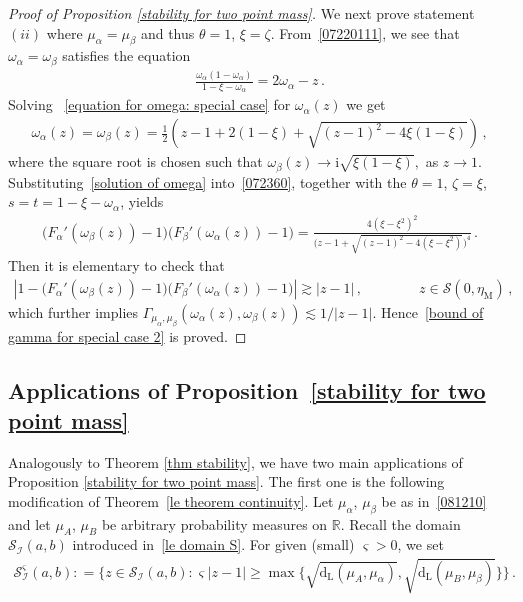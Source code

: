 \documentclass[10pt,reqno]{amsart}
\numberwithin{equation}{section}
\theoremstyle{plain}
\numberwithin{kevin}{section}
\theoremstyle{remark}
\newcommand{\R}{{\mathbb R }}
\newcommand{\deq}{\mathrel{\mathop:}=}
\newcommand{\dL}{\mathrm{d}_{\mathrm{L}}}
\begin{document}
\begin{proof}[Proof of Proposition \ref{stability for two point mass}]
We next prove statement $(ii)$ where $\mu_\alpha=\mu_\beta$ and thus $\theta=1$, $\xi=\zeta$. From~\eqref{07220111}, we see that $\omega_\alpha=\omega_\beta$ satisfies the equation
\begin{align}
\frac{\omega_\alpha(1-\omega_\alpha)}{1-\xi-\omega_\alpha}=2\omega_\alpha-z\,. \label{equation for omega: special case}
\end{align}
Solving ~\eqref{equation for omega: special case} for $\omega_\alpha(z)$ we get
\begin{align}
\omega_\alpha(z)=\omega_\beta(z)=\frac{1}{2}\left({z-1+2(1-\xi)+\sqrt{(z-1)^2-4\xi(1-\xi)}}\right)\,, \label{solution of omega}
\end{align}
where the square root is chosen such that $\omega_\beta(z)\to \mathrm{i}\sqrt{\xi(1-\xi)}, $ as $z\to 1$.  Substituting~\eqref{solution of omega} into~\eqref{072360}, together with the $\theta=1$, $\zeta=\xi$, $s=t=1-\xi-\omega_\alpha$, yields
\begin{align*}
\big(F_{\alpha}'(\omega_\beta(z))-1\big) \big(F_{\beta}'(\omega_\alpha(z))-1\big)=\frac{4(\xi-\xi^2)^2}{\big(z-1+\sqrt{(z-1)^2-4(\xi-\xi^2)}\big)^4}\,.
\end{align*}
Then it is elementary to check that
\begin{align*}
\left|1-\big(F_{\alpha}'(\omega_\beta(z))-1\big) \big(F_{\beta}'(\omega_\alpha(z))-1\big) \right|\gtrsim |z-1|\,,\qquad\qquad z\in\mathcal{S}(0,\eta_{\mathrm{M}})\,,
\end{align*}
which further implies  $\Gamma_{\mu_\alpha,\mu_\beta}(\omega_\alpha(z),\omega_\beta(z))\lesssim 1/|z-1|$. Hence~\eqref{bound of gamma for special case 2} is proved.
\end{proof}

\subsection{Applications of Proposition~\ref{stability for two point mass}}
Analogously to Theorem \ref{thm stability}, we have two main applications of Proposition \ref{stability for two point mass}. The first one is the following modification of Theorem~\ref{le theorem continuity}. Let $\mu_\alpha$, $\mu_\beta$ be as in~\eqref{081210} and let $\mu_A$, $\mu_B$ be arbitrary probability measures on $\R$. Recall the domain $\mathcal{S}_{\mathcal{I}}(a,b)$ introduced in~\eqref{le domain S}. For given (small) $\varsigma>0$, we set
\begin{align}
\mathcal{S}_{\mathcal{I}}^{\varsigma}(a,b)\deq\bigg\{z\in \mathcal{S}_{\mathcal{I}}(a,b): \varsigma |z-1|\geq \max\Big\{ \sqrt{\dL(\mu_A,\mu_\alpha)}, \sqrt{\dL(\mu_B,\mu_\beta)} \Big\}\bigg\}\,.\label{081501}
 \end{align}
\end{document}
